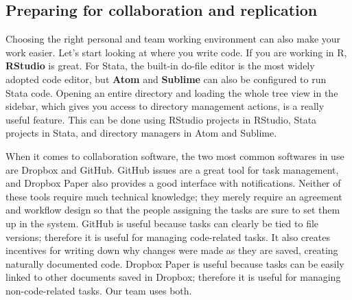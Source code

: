 \subsection{Preparing for collaboration and replication}

Choosing the right personal and team working environment can also make your work easier.
Let's start looking at where you write code. 
If you are working in R, \textbf{RStudio} is great.
For Stata, the built-in do-file editor is the most widely adopted code editor, 
but \textbf{Atom} and \textbf{Sublime} can also be configured to run Stata code.
Opening an entire directory and loading the whole tree view in the sidebar,
which gives you access to directory management actions, is a really useful feature.
This can be done using RStudio projects in RStudio, Stata projects in Stata, and directory managers in Atom and Sublime.


When it comes to collaboration software,
the two most common softwares in use are Dropbox and GitHub.
GitHub issues are a great tool for task management,
and Dropbox Paper also provides a good interface with notifications.
Neither of these tools require much technical knowledge;
they merely require an agreement and workflow design
so that the people assigning the tasks
are sure to set them up in the system.
GitHub is useful because tasks can clearly be tied to file versions;
therefore it is useful for managing code-related tasks. 
It also creates incentives for writing down why changes were made as they are saved,
creating naturally documented code.
Dropbox Paper is useful because tasks can be easily linked to other documents saved in Dropbox;
therefore it is useful for managing non-code-related tasks.
Our team uses both.
